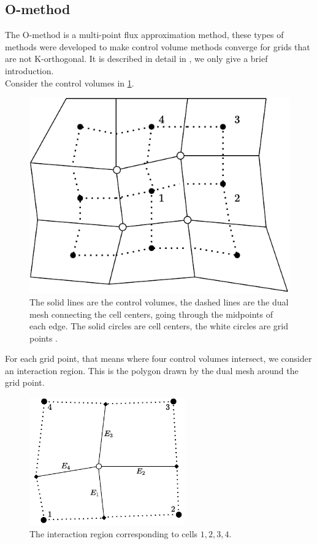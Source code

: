 \documentclass[../Main/main.tex]{subfiles}
\begin{document}
	\subsection*{O-method}
	The O-method is a multi-point flux approximation method, these types of methods were developed to make control volume methods converge for grids that are not K-orthogonal. It is described in detail in  \cite{Aavatsmark2002}, we only give a brief introduction.
	\\
	Consider the control volumes in \ref{fig:dualmesh}.
	\begin{figure}[H]
		\centering
		\includegraphics{dualmesh.pdf}
		
		\caption{The solid lines are the control volumes, the dashed lines are the dual mesh connecting the cell centers, going through the midpoints of each edge. The solid circles are cell centers, the white circles are grid points .}
		\label{fig:dualmesh}
	\end{figure}
	For each grid point, that means where four control volumes intersect, we consider an interaction region. This is the polygon drawn by the dual mesh around the grid point.
	\begin{figure}[H]
		\centering
		\includegraphics[width=0.6\textwidth]{Interaction region.pdf}
		\caption{The interaction region corresponding to cells $1,2,3,4$.}
		\label{fig:interactionregion}
	\end{figure}
\end{document}
